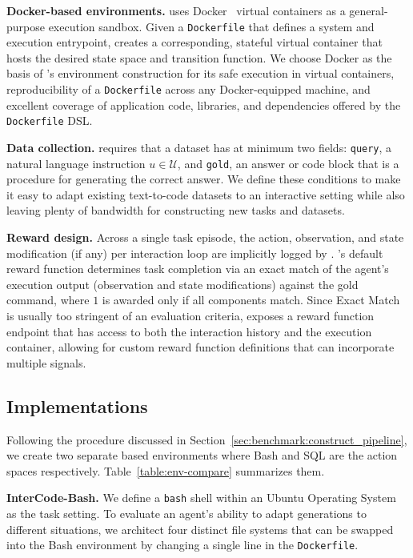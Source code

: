\textbf{Docker-based environments.}
\benchmark{} uses Docker~\cite{merkel2014docker} virtual containers as a general-purpose execution sandbox.
Given a \texttt{Dockerfile} that defines a system and execution entrypoint, \benchmark{} creates a corresponding, stateful virtual container that hosts the desired state space and transition function.
We choose Docker as the basis of \benchmark{}'s environment construction for its safe execution in virtual containers, reproducibility of a \texttt{Dockerfile} across any Docker-equipped machine, and excellent coverage of application code, libraries, and dependencies offered by the \texttt{Dockerfile} DSL.

\textbf{Data collection.}
\benchmark{} requires that a dataset has at minimum two fields: \texttt{query}, a natural language instruction $u \in \mathcal{U}$, and \texttt{gold}, an answer or code block that is a procedure for generating the correct answer.
We define these conditions to make it easy to adapt existing text-to-code datasets to an interactive setting while also leaving plenty of bandwidth for constructing new tasks and datasets.

\textbf{Reward design.}
Across a single task episode, the action, observation, and state modification (if any) per interaction loop are implicitly logged by \benchmark{}.
\benchmark{}'s default reward function determines task completion via an exact match of the agent's execution output (observation and state modifications) against the gold command, where $1$ is awarded only if all components match.
Since Exact Match is usually too stringent of an evaluation criteria, \benchmark{} exposes a reward function endpoint that has access to both the interaction history and the execution container, allowing for custom reward function definitions that can incorporate multiple signals.

\subsection{Implementations}
\label{sec:benchmark:ic_envs}

Following the procedure discussed in Section~\ref{sec:benchmark:construct_pipeline}, we create two separate \benchmark{} based environments where Bash and SQL are the action spaces respectively. Table~\ref{table:env-compare} summarizes them.



\textbf{InterCode-Bash.} We define a \texttt{bash} shell within an Ubuntu Operating System as the task setting.
To evaluate an agent's ability to adapt generations to different situations, we architect four distinct file systems that can be swapped into the Bash environment by changing a single line in the \texttt{Dockerfile}.

